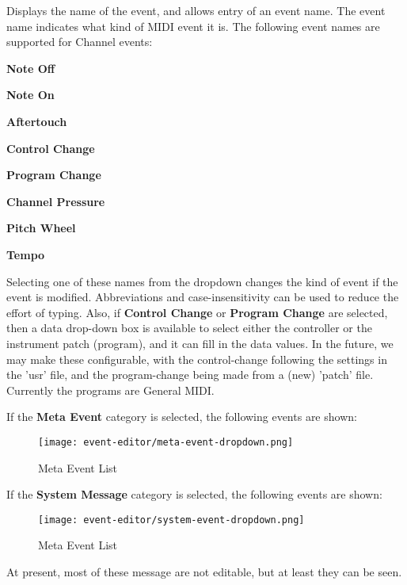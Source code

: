    Displays the name of the event, and allows entry of an event name.
   The event name indicates what kind of MIDI event it is. 
   The following event names are supported for Channel events:

   \begin{enumber}
      \item \textbf{Note Off}
      \item \textbf{Note On}
      \item \textbf{Aftertouch}
      \item \textbf{Control Change}
      \item \textbf{Program Change}
      \item \textbf{Channel Pressure}
      \item \textbf{Pitch Wheel}
      \item \textbf{Tempo}
   \end{enumber}

   Selecting one of these names from the dropdown changes the kind of event if
   the event is modified.  Abbreviations and case-insensitivity can be used to
   reduce the effort of typing.
   Also, if \textbf{Control Change} or
   \textbf{Program Change} are selected, then a data drop-down box is available
   to select either the controller or
   the instrument patch (program), and it can fill in the data values.
   In the future, we may make these configurable, with the control-change
   following the settings in the 'usr' file, and the program-change being made
   from a (new) 'patch' file. Currently the programs are General MIDI.

   If the \textbf{Meta Event} category is selected, the following events are
   shown:

\begin{figure}[H]
   \centering
   \texttt{[image: event-editor/meta-event-dropdown.png]}
   \caption{Meta Event List}
   \label{fig:event_editor_meta_dropdown}
\end{figure}

   If the \textbf{System Message} category is selected, the following events are
   shown:

\begin{figure}[H]
   \centering
   \texttt{[image: event-editor/system-event-dropdown.png]}
   \caption{Meta Event List}
   \label{fig:event_editor_system_dropdown}
\end{figure}

   At present, most of these message are not editable, but at least they can be
   seen.

